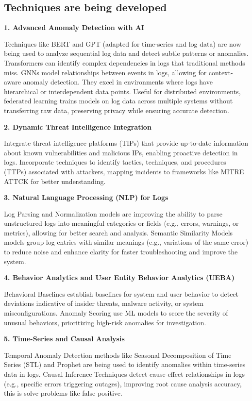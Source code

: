 \subsection{Techniques are being developed}

\textbf{1. Advanced Anomaly Detection with AI}

Techniques like BERT and GPT (adapted for time-series and log data) are now being used to analyze sequential log data and detect subtle patterns or anomalies. Transformers can identify complex dependencies in logs that traditional methods miss.
GNNs model relationships between events in logs, allowing for context-aware anomaly detection. They excel in environments where logs have hierarchical or interdependent data points. Useful for distributed environments, federated learning trains models on log data across multiple systems without transferring raw data, preserving privacy while ensuring accurate detection.

\textbf{2. Dynamic Threat Intelligence Integration}

Integrate threat intelligence platforms (TIPs) that provide up-to-date information about known vulnerabilities and malicious IPs, enabling proactive detection in logs. Incorporate techniques to identify tactics, techniques, and procedures (TTPs) associated with attackers, mapping incidents to frameworks like MITRE ATTCK for better understanding.

\textbf{3. Natural Language Processing (NLP) for Logs}

Log Parsing and Normalization models are improving the ability to parse unstructured logs into meaningful categories or fields (e.g., errors, warnings, or metrics), allowing for better search and analysis.
Semantic Similarity Models models group log entries with similar meanings (e.g., variations of the same error) to reduce noise and enhance clarity for faster troubleshooting and improve the system.

\textbf{4. Behavior Analytics and User Entity Behavior Analytics (UEBA)}

Behavioral Baselines establish baselines for system and user behavior to detect deviations indicative of insider threats, malware activity, or system misconfigurations.
Anomaly Scoring use ML models to score the severity of unusual behaviors, prioritizing high-risk anomalies for investigation.

\textbf{5. Time-Series and Causal Analysis}

Temporal Anomaly Detection methods like Seasonal Decomposition of Time Series (STL) and Prophet are being used to identify anomalies within time-series data in logs.
Causal Inference Techniques detect cause-effect relationships in logs (e.g., specific errors triggering outages), improving root cause analysis accuracy, this is solve problems like false positive.



